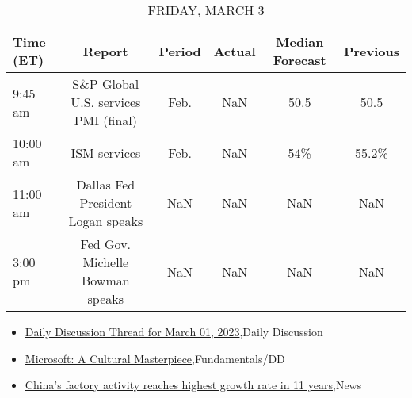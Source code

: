 \documentclass{article}%
\begin{document}
%


\begin{table}[htbp]%
\caption{FRIDAY, MARCH 3}%
\centering%
\begin{adjustbox}{width=1\textwidth}%
\begin{tabular}{lccccc}
\toprule
Time (ET) &                               Report & Period & Actual & Median Forecast & Previous \\
\midrule
  9:45 am & S\&P Global U.S. services PMI (final) &   Feb. &    NaN &            50.5 &     50.5 \\
 10:00 am &                         ISM services &   Feb. &    NaN &             54\% &    55.2\% \\
 11:00 am &    Dallas Fed President Logan speaks &    NaN &    NaN &             NaN &      NaN \\
  3:00 pm &      Fed Gov. Michelle Bowman speaks &    NaN &    NaN &             NaN &      NaN \\
\bottomrule
\end{tabular}
%
\end{adjustbox}%
\end{table}

%
\begin{itemize}%
\item%
\href{https://reddit.com/r/wallstreetbets/comments/11f0w3s/daily\_discussion\_thread\_for\_march\_01\_2023/}{Daily Discussion Thread for March 01, 2023},Daily Discussion%
\item%
\href{https://reddit.com/r/StockMarket/comments/11exuqa/microsoft\_a\_cultural\_masterpiece/}{Microsoft: A Cultural Masterpiece},Fundamentals/DD%
\item%
\href{https://reddit.com/r/Economics/comments/11evahd/chinas\_factory\_activity\_reaches\_highest\_growth/}{China's factory activity reaches highest growth rate in 11 years},News%
\end{itemize}%
\end{document}
